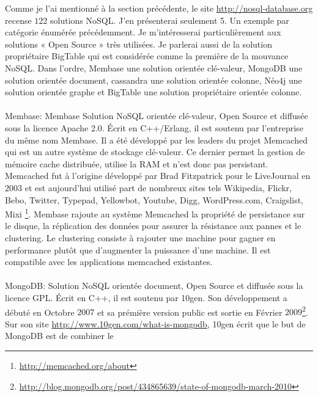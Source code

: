 Comme je l'ai mentionné à la section précédente, le
site \url{http://nosql-database.org} recense $122$
solutions \textsf{NoSQL}.  J'en présenterai seulement 5. Un exemple
par catégorie énumérée précédemment. Je m'intéresserai
particulièrement aux solutions « \textsf{Open Source} » très
utilisées. Je parlerai aussi de la solution propriétaire \textsf{BigTable}
qui est considérée comme la première de la
mouvance \textsf{NoSQL}. Dans l'ordre, \textsf{Membase} une solution
orientée \textsf{clé-valeur}, \textsf{MongoDB} une solution
orientée \textsf{document}, \textsf{cassandra} une solution
orientée \textsf{colonne}, \textsf{Néo4j} une solution
orientée \textsf{graphe} et \textsf{BigTable} une solution
propriétaire orientée \textsf{colonne}.
\\
\\
\textsf{Membase}: \textsf{Membase} Solution \textsf{NoSQL} orientée \textsf{clé-valeur}, Open Source et diffusée sous la licence Apache 2.0. Écrit en \textsf{C++/Erlang}, il est soutenu par l'entreprise du même nom \textsf{Membase}\cite{RickCattell}. Il a été développé par les leaders du projet \textsf{Memcached} qui est un
autre système de stockage \textsf{clé-valeur}. Ce dernier permet la
gestion de mémoire cache distribuée, utilise la \textsf{RAM} et n'est
donc pas persistant. \textsf{Memcached} fut à l'origine développé
par \textsf{Brad Fitzpatrick} pour le \textsf{LiveJournal} en $2003$
et est aujourd'hui utilisé part de nombreux sites
tels \textsf{Wikipedia, Flickr, Bebo, Twitter, Typepad, Yellowbot,
Youtube, Digg, WordPress.com, Craigslist,
Mixi} \footnote{\url{http://memcached.org/about}}. \textsf{Membase}
rajoute au système \textsf{Memcached} la propriété de persistance sur
le disque, la réplication des données pour assurer la résistance aux
pannes et le clustering. Le clustering consiste à rajouter une machine
pour gagner en performance plutôt que d'augmenter la puissance d'une
machine. Il est compatible avec les applications memcached existantes.
\\
\\ 
{\sf MongoDB}:  Solution \textsf{NoSQL} orientée \textsf{document},
Open Source et diffusée sous la licence \textsf{GPL}. Écrit
en \textsf{C++}, il est soutenu
par \textsf{10gen}\cite{RickCattell}. Son développement a débuté en Octobre $2007$ et sa prémière version public est sortie en Février $2009$\footnote{\url{http://blog.mongodb.org/post/434865639/state-of-mongodb-march-2010}}. Sur son
site \url{http://www.10gen.com/what-is-mongodb}, \textsf{10gen} écrit
que le but de \textsf{MongoDB} est de combiner le
